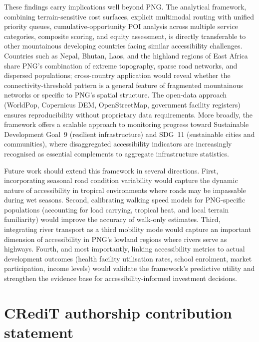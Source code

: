 \documentclass[review,3p,authoryear]{elsarticle}
\begin{document}
These findings carry implications well beyond PNG. The analytical framework, combining terrain-sensitive cost surfaces, explicit multimodal routing with unified priority queues, cumulative-opportunity POI analysis across multiple service categories, composite scoring, and equity assessment, is directly transferable to other mountainous developing countries facing similar accessibility challenges. Countries such as Nepal, Bhutan, Laos, and the highland regions of East Africa share PNG's combination of extreme topography, sparse road networks, and dispersed populations; cross-country application would reveal whether the connectivity-threshold pattern is a general feature of fragmented mountainous networks or specific to PNG's spatial structure. The open-data approach (WorldPop, Copernicus DEM, OpenStreetMap, government facility registers) ensures reproducibility without proprietary data requirements. More broadly, the framework offers a scalable approach to monitoring progress toward Sustainable Development Goal~9 (resilient infrastructure) and SDG~11 (sustainable cities and communities), where disaggregated accessibility indicators are increasingly recognised as essential complements to aggregate infrastructure statistics.

Future work should extend this framework in several directions. First, incorporating seasonal road condition variability would capture the dynamic nature of accessibility in tropical environments where roads may be impassable during wet seasons. Second, calibrating walking speed models for PNG-specific populations (accounting for load carrying, tropical heat, and local terrain familiarity) would improve the accuracy of walk-only estimates. Third, integrating river transport as a third mobility mode would capture an important dimension of accessibility in PNG's lowland regions where rivers serve as highways. Fourth, and most importantly, linking accessibility metrics to actual development outcomes (health facility utilisation rates, school enrolment, market participation, income levels) would validate the framework's predictive utility and strengthen the evidence base for accessibility-informed investment decisions.

\section*{CRediT authorship contribution statement}
\end{document}
